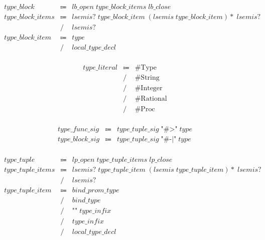 \begin{align*}
    \begin{array}{rcll}
        \mathit{type\_block}
        &\Coloneq &\mathit{lb\_open}\; \mathit{type\_block\_items}\; \mathit{lb\_close} \\
        \mathit{type\_block\_items}
        &\Coloneq &\mathit{lsemis}{?}\; \mathit{type\_block\_item}\; (\mathit{lsemis}\; \mathit{type\_block\_item}){*}\; \mathit{lsemis}{?} \\
        &\mathrel{/} &\mathit{lsemis}{?} \\
        \mathit{type\_block\_item}
        &\Coloneq &\mathit{type} \\
        &\mathrel{/} &\mathit{local\_type\_decl}
    \end{array}
\end{align*}

\begin{align*}
    \begin{array}{rcll}
        \mathit{type\_literal}
        &\Coloneq &\mathrm{\#Type} \\
        &\mathrel{/} &\mathrm{\#String} \\
        &\mathrel{/} &\mathrm{\#Integer} \\
        &\mathrel{/} &\mathrm{\#Rational} \\
        &\mathrel{/} &\mathrm{\#Proc}
    \end{array}
\end{align*}

\begin{align*}
    \begin{array}{rcll}
        \mathit{type\_func\_sig}
        &\Coloneq &\mathit{type\_tuple\_sig}\; \texttt{"\#>"}\; \mathit{type} \\
        \mathit{type\_block\_sig}
        &\Coloneq &\mathit{type\_tuple\_sig}\; \texttt{"\#-|"}\; \mathit{type}
    \end{array}
\end{align*}

\begin{align*}
    \begin{array}{rcll}
        \mathit{type\_tuple}
        &\Coloneq &\mathit{lp\_open}\; \mathit{type\_tuple\_items}\; \mathit{lp\_close} \\
        \mathit{type\_tuple\_items}
        &\Coloneq &\mathit{lsemis}{?}\; \mathit{type\_tuple\_item}\; (\mathit{lsemis}\; \mathit{type\_tuple\_item}){*}\; \mathit{lsemis}{?} \\
        &\mathrel{/} &\mathit{lsemis}{?} \\
        \mathit{type\_tuple\_item}
        &\Coloneq &\mathit{bind\_prom\_type} \\
        &\mathrel{/} &\mathit{bind\_type} \\
        &\mathrel{/} &\texttt{"\^{}"}\; \mathit{type\_infix} \\
        &\mathrel{/} &\mathit{type\_infix} \\
        &\mathrel{/} &\mathit{local\_type\_decl}
    \end{array}
\end{align*}

